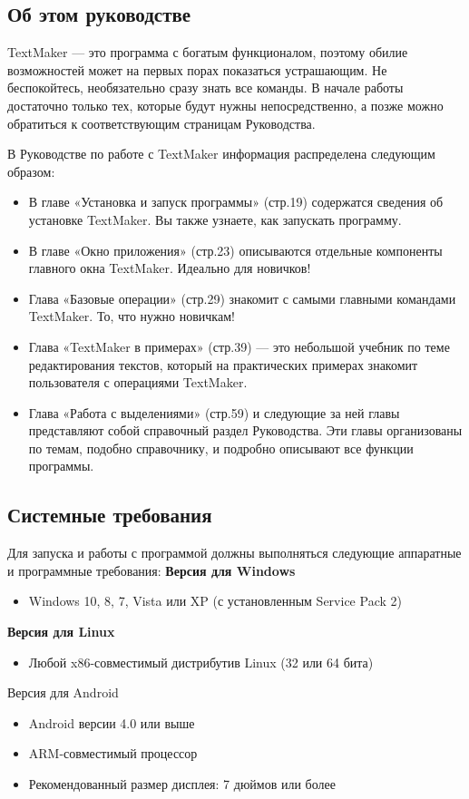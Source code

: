 \documentclass[a4paper,10pt]{article}
\begin{document}
\subsection{Об этом руководстве}
TextMaker --- это программа с богатым функционалом, поэтому обилие возможностей может на первых порах показаться устрашающим. Не беспокойтесь, необязательно сразу знать все команды. В начале работы достаточно только тех, которые будут нужны непосредственно, а позже можно обратиться к соответствующим страницам Руководства.

В Руководстве по работе с TextMaker информация распределена следующим образом:
\begin{itemize}
 \item В главе «Установка и запуск программы» (стр.19) содержатся сведения об установке TextMaker.  Вы также узнаете, как запускать программу.
 \item В главе «Окно приложения» (стр.23) описываются отдельные компоненты главного окна TextMaker. Идеально для новичков!
 \item Глава «Базовые операции» (стр.29) знакомит с самыми главными командами TextMaker. То, что нужно новичкам!
 \item Глава «TextMaker в примерах» (стр.39) — это небольшой учебник по  теме редактирования текстов, который на практических примерах знакомит пользователя с операциями TextMaker.
 \item Глава «Работа с выделениями» (стр.59) и следующие за ней главы представляют собой справочный раздел Руководства. Эти главы организованы по темам, подобно справочнику, и подробно описывают все функции программы.
\end{itemize}
\subsection{Системные требования}
Для запуска и работы с программой должны выполняться следующие аппаратные и программные требования:
\textbf{Версия для Windows}
\begin{itemize}
 \item Windows 10, 8, 7, Vista или XP (с установленным Service Pack 2)
\end{itemize}
\textbf{Версия для Linux}
\begin{itemize}
 \item Любой x86-совместимый дистрибутив Linux (32 или 64 бита)
\end{itemize}
Версия для Android

\begin{itemize}
 \item Android версии 4.0 или выше
 \item ARM-совместимый процессор
 \item Рекомендованный размер дисплея: 7 дюймов или более
\end{itemize}
\end{document}
